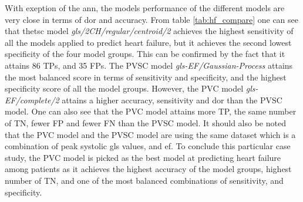 With exeption of the \acrshort{ann}, the models performance of the different models are very close in terms of \acrshort{dor} and accuracy.
From table \ref{tab:hf_compare} one can see that the\acrshort{tsc} model \textit{gls/2CH/regular/centroid/2} achieves the highest sensitivity of all the models applied to predict heart failure,
but it achieves the second lowest specificity of the four model groups. This can be confirmed by the fact that it attains 86 TPs, and 35 FPs.
The PVSC model \textit{gls-EF/Gaussian-Process} attains the most balanced score in terms of sensitivity and specificity, and the highest specificity score of all the model groups.
However, the PVC model \textit{gls-EF/complete/2} attains a higher accuracy, sensitivity and \acrshort{dor} than the PVSC model. 
One can also see that the PVC model attains more TP, the same number of TN, fewer FP and fewer FN than the PVSC model.
It should also be noted that the PVC model and the PVSC model are using the same dataset which is a combination of peak systolic \acrshort{gls} values, and \acrshort{ef}.
To conclude this particular case study, the PVC model is picked as the best model at predicting heart failure among patients as it achieves the highest accuracy of the model groups, highest
number of TN, and one of the most balanced combinations of sensitivity, and specificity.


